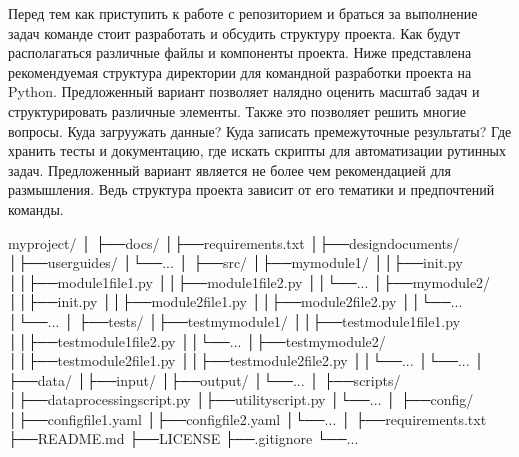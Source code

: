 \documentclass[letterpaper,10pt,russian]{sphinxmanual}
\begin{document}
\sphinxAtStartPar
Перед тем как приступить к работе с репозиторием и браться за выполнение задач команде стоит разработать и обсудить структуру проекта. Как будут располагаться различные файлы и компоненты проекта. Ниже представлена рекомендуемая структура директории для командной разработки проекта на Python. Предложенный вариант позволяет налядно оценить масштаб задач и структурировать различные элементы. Также это позволяет решить многие вопросы. Куда загруужать данные? Куда записать премежуточные результаты? Где хранить тесты и документацию, где искать скрипты для автоматизации рутинных задач. Предложенный вариант является не более чем рекомендацией для размышления. Ведь структура проекта зависит от его тематики и предпочтений команды.

\begin{sphinxVerbatim}[commandchars=\\\{\}]
my\PYGZus{}project/
│
├──docs/
│├──requirements.txt
│├──design\PYGZus{}documents/
│├──user\PYGZus{}guides/
│└──...
│
├──src/
│├──my\PYGZus{}module\PYGZus{}1/
││├──\PYGZus{}\PYGZus{}init\PYGZus{}\PYGZus{}.py
││├──module\PYGZus{}1\PYGZus{}file1.py
││├──module\PYGZus{}1\PYGZus{}file2.py
││└──...
│├──my\PYGZus{}module\PYGZus{}2/
││├──\PYGZus{}\PYGZus{}init\PYGZus{}\PYGZus{}.py
││├──module\PYGZus{}2\PYGZus{}file1.py
││├──module\PYGZus{}2\PYGZus{}file2.py
││└──...
│└──...
│
├──tests/
│├──test\PYGZus{}my\PYGZus{}module\PYGZus{}1/
││├──test\PYGZus{}module\PYGZus{}1\PYGZus{}file1.py
││├──test\PYGZus{}module\PYGZus{}1\PYGZus{}file2.py
││└──...
│├──test\PYGZus{}my\PYGZus{}module\PYGZus{}2/
││├──test\PYGZus{}module\PYGZus{}2\PYGZus{}file1.py
││├──test\PYGZus{}module\PYGZus{}2\PYGZus{}file2.py
││└──...
│└──...
│
├──data/
│├──input/
│├──output/
│└──...
│
├──scripts/
│├──data\PYGZus{}processing\PYGZus{}script.py
│├──utility\PYGZus{}script.py
│└──...
│
├──config/
│├──config\PYGZus{}file1.yaml
│├──config\PYGZus{}file2.yaml
│└──...
│
├──requirements.txt
├──README.md
├──LICENSE
├──.gitignore
└──...
\end{sphinxVerbatim}
\end{document}

